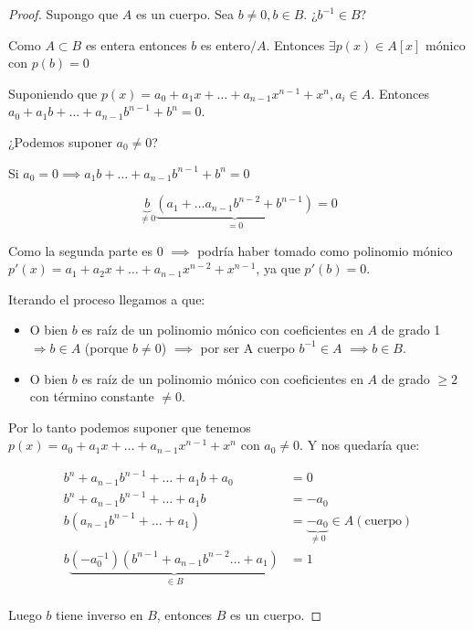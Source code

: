 	\begin{proof}

		\proofpart{$\Rightarrow$}

		Supongo que $A$ es un cuerpo. Sea $b \neq 0, b \in B$. ¿$b^{-1} \in B$?

		Como $A \subset B$ es entera entonces $b$ es entero$/A$. Entonces $\exists p(x) \in A[x]$ mónico con $p(b)=0$

		Suponiendo que $p(x)=a_0 + a_1x + … + a_{n-1}x^{n-1} + x^n, a_i \in A$. Entonces $a_0 + a_1 b + … + a_{n-1}b^{n-1} + b^n = 0$.

		¿Podemos suponer $a_0 \neq 0$?

		Si $a_0 = 0 \implies  a_1 b + … + a_{n-1}b^{n-1}+b^{n} = 0$

		\[ \underbrace{b}_{\neq 0} \underbrace{(a_1 + … a_{n-1}b^{n-2} + b^{n-1})}_{=0} = 0\]

		Como la segunda parte es 0 $\implies$ podría haber tomado como polinomio mónico $p'(x) = a_1 + a_2 x + … + a_{n-1}x^{n-2} + x^{n-1}$, ya que $p'(b)=0$.

		Iterando el proceso llegamos a que:

		\begin{itemize}
			\item O bien $b$ es raíz de un polinomio mónico con coeficientes en $A$ de grado 1 $\Rightarrow b \in A$ (porque $b \neq 0$) $\implies$ por ser A cuerpo $b^{-1} \in A$  $\implies b \in B$.

			\item O bien $b$ es raíz de un polinomio mónico con coeficientes en $A$ de grado $\geq 2$ con término constante $\neq 0$.

		\end{itemize}

		Por lo tanto podemos suponer que tenemos $p(x) = a_0 + a_1x + … + a_{n-1}x^{n-1} + x^n$ con $a_0 \neq 0$. Y nos quedaría que:

		\begin{align*}
		b^n + a_{n-1}b^{n-1}+…+a_1b + a_0 &= 0 \\
		b^n + a_{n-1}b^{n-1}+…+a_1b &= -a_0 \\
		b(a_{n-1}b^{n-1}+…+a_1) &= \underbrace{-a_0}_{\neq 0} \in A (\text{cuerpo}) \\
		b \underbrace{(-a_0^{-1})(b^{n-1}+a_{n-1}b^{n-2}…+a_1)}_{\in B} &= 1 \\
		\end{align*}
		
		Luego $b$ tiene inverso en $B$, entonces $B$ es un cuerpo.


\end{proof}

